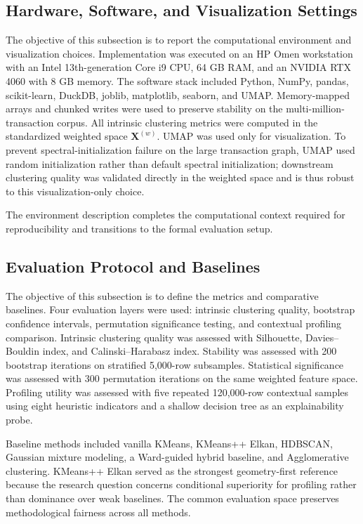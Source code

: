 \documentclass{ieeeaccess}
\begin{document}
\subsection{Hardware, Software, and Visualization Settings}

The objective of this subsection is to report the computational environment and visualization choices. Implementation was executed on an HP Omen workstation with an Intel 13th-generation Core i9 CPU, 64 GB RAM, and an NVIDIA RTX 4060 with 8 GB memory. The software stack included Python, NumPy, pandas, scikit-learn, DuckDB, joblib, matplotlib, seaborn, and UMAP. Memory-mapped arrays and chunked writes were used to preserve stability on the multi-million-transaction corpus. All intrinsic clustering metrics were computed in the standardized weighted space $\mathbf{X}^{(w)}$. UMAP was used only for visualization. To prevent spectral-initialization failure on the large transaction graph, UMAP used random initialization rather than default spectral initialization; downstream clustering quality was validated directly in the weighted space and is thus robust to this visualization-only choice.

The environment description completes the computational context required for reproducibility and transitions to the formal evaluation setup.

\subsection{Evaluation Protocol and Baselines}

The objective of this subsection is to define the metrics and comparative baselines. Four evaluation layers were used: intrinsic clustering quality, bootstrap confidence intervals, permutation significance testing, and contextual profiling comparison. Intrinsic clustering quality was assessed with Silhouette, Davies--Bouldin index, and Calinski--Harabasz index. Stability was assessed with 200 bootstrap iterations on stratified 5,000-row subsamples. Statistical significance was assessed with 300 permutation iterations on the same weighted feature space. Profiling utility was assessed with five repeated 120,000-row contextual samples using eight heuristic indicators and a shallow decision tree as an explainability probe.

Baseline methods included vanilla KMeans, KMeans++ Elkan, HDBSCAN, Gaussian mixture modeling, a Ward-guided hybrid baseline, and Agglomerative clustering. KMeans++ Elkan served as the strongest geometry-first reference because the research question concerns conditional superiority for profiling rather than dominance over weak baselines. The common evaluation space preserves methodological fairness across all methods.
\end{document}
